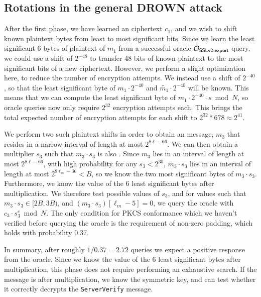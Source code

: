 \subsection{Rotations in the general DROWN attack}
\label{sec:general-rotations}
After the first phase, we have learned an \sslconform ciphertext $c_1$, and we wish to shift known plaintext bytes from least to most significant bits.
Since we learn the least significant 6 bytes of plaintext of $m_1$ from a successful oracle $\mathcal{O}_\textsf{SSLv2-export}$ query, we could use a shift of $2^{-48}$ to transfer 48 bits of known plaintext to the most significant bits of a new ciphertext.  However, we perform a slight optimization here, to reduce the number of encryption attempts.  We instead use a shift of $2^{-40}$, so that the least significant byte of $m_1 \cdot 2^{-40}$ and $\tilde{m_1} \cdot 2^{-40}$ will be known.  This means that we can compute the least significant byte of $m_1 \cdot 2^{-40} \cdot s \bmod N$, so oracle queries now only require $2^{32}$ encryption attempts each. This brings the total expected number of encryption attempts for each shift to $2^{32} * 678 \approx 2^{41}$.

We perform two such plaintext shifts in order to obtain an \sslconform message, $m_3$ that resides in a narrow interval of length at most $2^{8\ell-66}$. We can then obtain a multiplier $s_3$ such that $m_3 \cdot s_3$ is also \sslconform.
Since $m_3$ lies in an interval of length at most $2^{8\ell-66}$, with high probability for any $s_3 < 2^{30}$, $m_3 \cdot s_3$ lies in an interval of length  at most $2^{8\ell_m-36} < B$, so we know the two most significant bytes of $m_3 \cdot s_3$.
Furthermore, we know the value of the 6 least significant bytes after multiplication.
We therefore test possible values of $s_3$, and for values such that
$m_3 \cdot s_3 \in [2B, 3B)$, and $(m_3 \cdot s_3) [\ell_m - 5] = 0$,
we query the oracle with $c_3 \cdot s_3^e \bmod N$.
The only condition for PKCS conformance which we haven't verified before querying the oracle is the requirement of non-zero padding, which holds with probability 0.37.

In summary, after roughly $1 / 0.37 = 2.72$ queries we expect a positive response from the oracle.
Since we know the value of the 6 least significant bytes after multiplication,
this phase does not require performing an exhaustive search. If the message is \sslconform after multiplication, we know the symmetric key, and can test whether it correctly decrypts the \texttt{ServerVerify} message.

